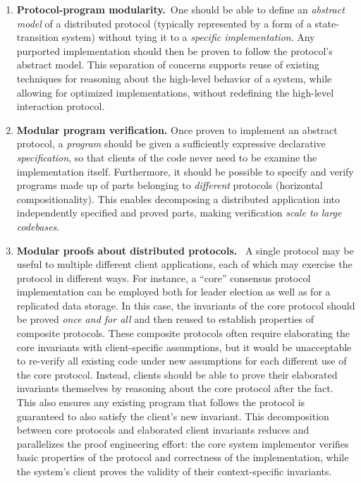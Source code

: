 \begin{enumerate}
\item \textbf{Protocol-program modularity.}~One should be
able to define an \emph{abstract model} of a distributed protocol
(typically represented by a form of a state-transition system) without
tying it to a \emph{specific implementation}.
Any purported implementation should then be
proven to follow the protocol's abstract model.
This separation of concerns supports reuse of existing techniques for
reasoning about the high-level behavior of a system, while allowing
for optimized implementations, without redefining the high-level
interaction protocol.

\item \textbf{Modular program verification.} Once proven to implement
  an abstract protocol, a \emph{program} should be given a
  sufficiently expressive declarative \emph{specification}, so that
  clients of the code never need to be examine the implementation itself.
%
  Furthermore, it should be possible to specify and verify programs
  made up of parts belonging to \emph{different} protocols (horizontal
  compositionality).
%
  This enables decomposing a distributed application into
  independently specified and proved parts, making verification
  \emph{scale to large codebases}.

\item \textbf{Modular proofs about distributed protocols.}~
  A single protocol may be useful to multiple different client
  applications, each of which may exercise the protocol in
  different ways.
%
  For instance, a ``core'' consensus protocol implementation can be
  employed both for leader election as well as for a replicated data
  storage.
  In this case, the invariants of the core protocol should be proved
  \emph{once and for all} and then reused to establish
  properties of composite protocols.
  These composite protocols often require elaborating the core
  invariants with client-specific assumptions, but it would be
  unacceptable to re-verify all existing code under new
  assumptions for each different use of the core protocol.
  Instead, clients should be able to prove their elaborated invariants
  themselves by reasoning about the core protocol after the fact.
  This also ensures any existing program that follows the protocol is
  guaranteed to also satisfy the client's new invariant.
  This decomposition between core protocols and elaborated client
  invariants reduces and parallelizes the proof engineering effort:
  the core system implementor verifies basic properties of the
  protocol and correctness of the implementation, while the system's
  client proves the validity of their context-specific invariants.

\end{enumerate}


